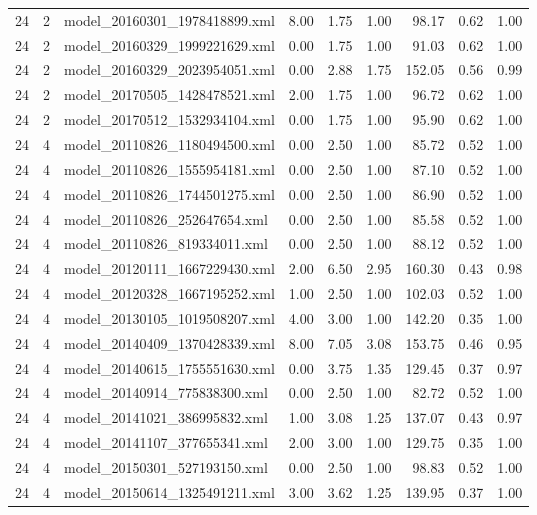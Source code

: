 \begin{table}[ht]
\begin{tabular}{rrlrrrrrr}
   24 &   2 & model\_20160301\_1978418899.xml & 8.00 & 1.75 & 1.00 & 98.17 & 0.62 & 1.00 \\ 
   24 &   2 & model\_20160329\_1999221629.xml & 0.00 & 1.75 & 1.00 & 91.03 & 0.62 & 1.00 \\ 
   24 &   2 & model\_20160329\_2023954051.xml & 0.00 & 2.88 & 1.75 & 152.05 & 0.56 & 0.99 \\ 
   24 &   2 & model\_20170505\_1428478521.xml & 2.00 & 1.75 & 1.00 & 96.72 & 0.62 & 1.00 \\ 
   24 &   2 & model\_20170512\_1532934104.xml & 0.00 & 1.75 & 1.00 & 95.90 & 0.62 & 1.00 \\ 
   24 &   4 & model\_20110826\_1180494500.xml & 0.00 & 2.50 & 1.00 & 85.72 & 0.52 & 1.00 \\ 
   24 &   4 & model\_20110826\_1555954181.xml & 0.00 & 2.50 & 1.00 & 87.10 & 0.52 & 1.00 \\ 
   24 &   4 & model\_20110826\_1744501275.xml & 0.00 & 2.50 & 1.00 & 86.90 & 0.52 & 1.00 \\ 
   24 &   4 & model\_20110826\_252647654.xml & 0.00 & 2.50 & 1.00 & 85.58 & 0.52 & 1.00 \\ 
   24 &   4 & model\_20110826\_819334011.xml & 0.00 & 2.50 & 1.00 & 88.12 & 0.52 & 1.00 \\ 
   24 &   4 & model\_20120111\_1667229430.xml & 2.00 & 6.50 & 2.95 & 160.30 & 0.43 & 0.98 \\ 
   24 &   4 & model\_20120328\_1667195252.xml & 1.00 & 2.50 & 1.00 & 102.03 & 0.52 & 1.00 \\ 
   24 &   4 & model\_20130105\_1019508207.xml & 4.00 & 3.00 & 1.00 & 142.20 & 0.35 & 1.00 \\ 
   24 &   4 & model\_20140409\_1370428339.xml & 8.00 & 7.05 & 3.08 & 153.75 & 0.46 & 0.95 \\ 
   24 &   4 & model\_20140615\_1755551630.xml & 0.00 & 3.75 & 1.35 & 129.45 & 0.37 & 0.97 \\ 
   24 &   4 & model\_20140914\_775838300.xml & 0.00 & 2.50 & 1.00 & 82.72 & 0.52 & 1.00 \\ 
   24 &   4 & model\_20141021\_386995832.xml & 1.00 & 3.08 & 1.25 & 137.07 & 0.43 & 0.97 \\ 
   24 &   4 & model\_20141107\_377655341.xml & 2.00 & 3.00 & 1.00 & 129.75 & 0.35 & 1.00 \\ 
   24 &   4 & model\_20150301\_527193150.xml & 0.00 & 2.50 & 1.00 & 98.83 & 0.52 & 1.00 \\ 
   24 &   4 & model\_20150614\_1325491211.xml & 3.00 & 3.62 & 1.25 & 139.95 & 0.37 & 1.00 \\ 

\end{tabular}
\end{table}
